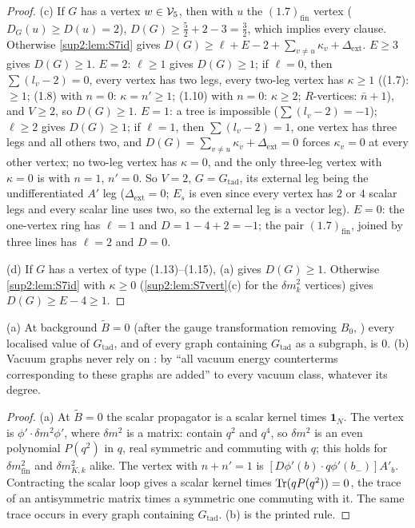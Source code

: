 \begin{proof}
(c) If $G$ has a vertex $w\in\mathcal V_5$, then with $u$ the $(1.7)_{\mathrm{fin}}$ vertex ($D_G(u)\ge D(u)=2$), $D(G)\ge\frac52+2-3=\frac32$, which implies every clause. Otherwise \cref{sup2:lem:S7id} gives $D(G)\ge\ell+E-2+\sum_{v\ne u}\kappa_v+\Delta_{\mathrm{ext}}$. $E\ge3$ gives $D(G)\ge1$. $E=2$: $\ell\ge1$ gives $D(G)\ge1$; if $\ell=0$, then $\sum(l_v-2)=0$, every vertex has two legs, every two-leg vertex has $\kappa\ge1$ ((1.7): $\ge1$; (1.8) with $n=0$: $\kappa=n'\ge1$; (1.10) with $n=0$: $\kappa\ge2$; $R$-vertices: $\bar n+1$), and $V\ge2$, so $D(G)\ge1$. $E=1$: a tree is impossible ($\sum(l_v-2)=-1$); $\ell\ge2$ gives $D(G)\ge1$; if $\ell=1$, then $\sum(l_v-2)=1$, one vertex has three legs and all others two, and $D(G)=\sum_{v\ne u}\kappa_v+\Delta_{\mathrm{ext}}=0$ forces $\kappa_v=0$ at every other vertex; no two-leg vertex has $\kappa=0$, and the only three-leg vertex with $\kappa=0$ is \cite[(1.8)]{Ba3} with $n=1$, $n'=0$. So $V=2$, $G=G_{\mathrm{tad}}$, its external leg being the undifferentiated $A'$ leg ($\Delta_{\mathrm{ext}}=0$; $E_s$ is even since every vertex has $2$ or $4$ scalar legs and every scalar line uses two, so the external leg is a vector leg). $E=0$: the one-vertex ring has $\ell=1$ and $D=1-4+2=-1$; the pair $(1.7)_{\mathrm{fin}}$, \cite[(1.6)]{Ba3} joined by three lines has $\ell=2$ and $D=0$.

(d) If $G$ has a vertex of type (1.13)--(1.15), (a) gives $D(G)\ge1$. Otherwise \cref{sup2:lem:S7id} with $\kappa\ge0$ (\cref{sup2:lem:S7vert}(c) for the $\delta m^2_k$ vertices) gives $D(G)\ge E-4\ge1$.
\end{proof}

\begin{lemma}\label{sup2:lem:S7exc}
\textup{(a)} At background $\tilde B=0$ (after the gauge transformation removing $B_0$, \cite[p.~433]{Ba3}) every localised value of $G_{\mathrm{tad}}$, and of every graph containing $G_{\mathrm{tad}}$ as a subgraph, is $0$. \textup{(b)} Vacuum graphs never rely on \cite[Cor.~2.3]{Ba3}: by \cite[p.~432]{Ba3} ``all vacuum energy counterterms corresponding to these graphs are added'' to every vacuum class, whatever its degree.
\end{lemma}

\begin{proof}
(a) At $\tilde B=0$ the scalar propagator is a scalar kernel times $\mathbf 1_N$. The vertex \cite[(1.7)]{Ba3} is $\phi'\cdot\delta m^2\phi'$, where $\delta m^2$ is a matrix: \cite[(1.22)--(1.23), pp.~416--417]{Ba3} contain $q^2$ and $q^4$, so $\delta m^2$ is an even polynomial $P(q^2)$ in $q$, real symmetric and commuting with $q$; this holds for $\delta m^2_{\mathrm{fin}}$ and $\delta m^2_{K,k}$ alike. The vertex \cite[(1.8)]{Ba3} with $n+n'=1$ is $[D\phi'(b)\cdot q\phi'(b_-)]A'_b$. Contracting the scalar loop gives a scalar kernel times $\operatorname{Tr}(qP(q^2))=0$, the trace of an antisymmetric matrix times a symmetric one commuting with it. The same trace occurs in every graph containing $G_{\mathrm{tad}}$. (b) is the printed rule.
\end{proof}

